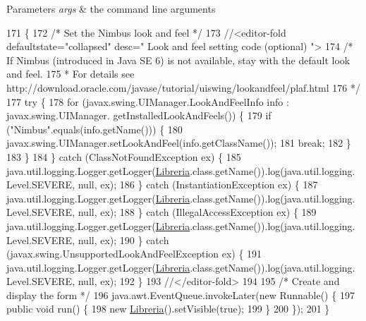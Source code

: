 \begin{DoxyParams}{Parameters}
{\em args} & the command line arguments \\
\hline
\end{DoxyParams}

\begin{DoxyCode}
171                                            \{
172         \textcolor{comment}{/* Set the Nimbus look and feel */}
173         \textcolor{comment}{//<editor-fold defaultstate="collapsed" desc=" Look and feel setting code (optional) ">}
174         \textcolor{comment}{/* If Nimbus (introduced in Java SE 6) is not available, stay with the default look and feel.}
175 \textcolor{comment}{         * For details see http://download.oracle.com/javase/tutorial/uiswing/lookandfeel/plaf.html }
176 \textcolor{comment}{         */}
177         \textcolor{keywordflow}{try} \{
178             \textcolor{keywordflow}{for} (javax.swing.UIManager.LookAndFeelInfo info : javax.swing.UIManager.
      getInstalledLookAndFeels()) \{
179                 \textcolor{keywordflow}{if} (\textcolor{stringliteral}{"Nimbus"}.equals(info.getName())) \{
180                     javax.swing.UIManager.setLookAndFeel(info.getClassName());
181                     \textcolor{keywordflow}{break};
182                 \}
183             \}
184         \} \textcolor{keywordflow}{catch} (ClassNotFoundException ex) \{
185             java.util.logging.Logger.getLogger(\mbox{\hyperlink{classpecl3ignacioriberalocks_1_1_libreria_ade479befa1d595d3476eecaf77ef6330}{Libreria}}.class.getName()).log(java.util.logging.
      Level.SEVERE, null, ex);
186         \} \textcolor{keywordflow}{catch} (InstantiationException ex) \{
187             java.util.logging.Logger.getLogger(\mbox{\hyperlink{classpecl3ignacioriberalocks_1_1_libreria_ade479befa1d595d3476eecaf77ef6330}{Libreria}}.class.getName()).log(java.util.logging.
      Level.SEVERE, null, ex);
188         \} \textcolor{keywordflow}{catch} (IllegalAccessException ex) \{
189             java.util.logging.Logger.getLogger(\mbox{\hyperlink{classpecl3ignacioriberalocks_1_1_libreria_ade479befa1d595d3476eecaf77ef6330}{Libreria}}.class.getName()).log(java.util.logging.
      Level.SEVERE, null, ex);
190         \} \textcolor{keywordflow}{catch} (javax.swing.UnsupportedLookAndFeelException ex) \{
191             java.util.logging.Logger.getLogger(\mbox{\hyperlink{classpecl3ignacioriberalocks_1_1_libreria_ade479befa1d595d3476eecaf77ef6330}{Libreria}}.class.getName()).log(java.util.logging.
      Level.SEVERE, null, ex);
192         \}
193         \textcolor{comment}{//</editor-fold>}
194 
195         \textcolor{comment}{/* Create and display the form */}
196         java.awt.EventQueue.invokeLater(\textcolor{keyword}{new} Runnable() \{
197             \textcolor{keyword}{public} \textcolor{keywordtype}{void} run() \{
198                 \textcolor{keyword}{new} \mbox{\hyperlink{classpecl3ignacioriberalocks_1_1_libreria_ade479befa1d595d3476eecaf77ef6330}{Libreria}}().setVisible(\textcolor{keyword}{true});
199             \}
200         \});
201     \}
\end{DoxyCode}


